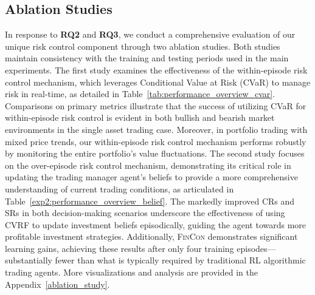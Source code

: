 \subsection{Ablation Studies}
In response to \textbf{RQ2} and \textbf{RQ3}, we conduct a comprehensive evaluation of our unique risk control component through two ablation studies. Both studies maintain consistency with the training and testing periods used in the main experiments. The first study examines the effectiveness of the within-episode risk control mechanism, which leverages Conditional Value at Risk (CVaR) to manage risk in real-time, as detailed in Table~\ref{tab:performance_overview_cvar}. Comparisons on primary metrics illustrate that the success of utilizing CVaR for within-episode risk control is evident in both bullish and bearish market environments in the single asset trading case. Moreover, in portfolio trading with mixed
price trends, our within-episode risk control mechanism performs robustly by monitoring the entire portfolio’s value fluctuations. The second study focuses on the over-episode risk control mechanism, demonstrating its critical role in updating the trading manager agent’s beliefs to provide a more comprehensive understanding of current trading conditions, as articulated in Table~\ref{exp2:performance_overview_belief}. The markedly improved CRs and SRs in both decision-making scenarios underscore the effectiveness of using CVRF to update investment beliefs episodically, guiding the agent towards more profitable investment strategies. Additionally, \textsc{FinCon} demonstrates significant learning gains, achieving these results after only four training episodes—substantially fewer than what is typically required by traditional RL algorithmic trading agents. More visualizations and analysis are provided in the Appendix~\ref{ablation_study}.  

